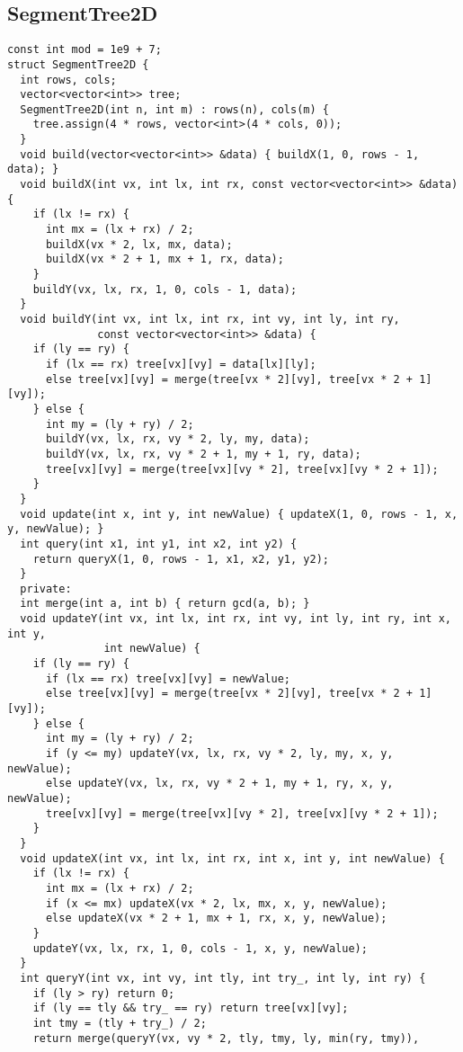 \documentclass[twoside]{article}
\begin{document}
\begin{multicols*}{2}
{\subsection*{SegmentTree2D}
}
\begin{verbatim}
const int mod = 1e9 + 7;
struct SegmentTree2D {
  int rows, cols;
  vector<vector<int>> tree;
  SegmentTree2D(int n, int m) : rows(n), cols(m) {
    tree.assign(4 * rows, vector<int>(4 * cols, 0));
  }
  void build(vector<vector<int>> &data) { buildX(1, 0, rows - 1, data); }
  void buildX(int vx, int lx, int rx, const vector<vector<int>> &data) {
    if (lx != rx) {
      int mx = (lx + rx) / 2;
      buildX(vx * 2, lx, mx, data);
      buildX(vx * 2 + 1, mx + 1, rx, data);
    }
    buildY(vx, lx, rx, 1, 0, cols - 1, data);
  }
  void buildY(int vx, int lx, int rx, int vy, int ly, int ry,
              const vector<vector<int>> &data) {
    if (ly == ry) {
      if (lx == rx) tree[vx][vy] = data[lx][ly];
      else tree[vx][vy] = merge(tree[vx * 2][vy], tree[vx * 2 + 1][vy]);
    } else {
      int my = (ly + ry) / 2;
      buildY(vx, lx, rx, vy * 2, ly, my, data);
      buildY(vx, lx, rx, vy * 2 + 1, my + 1, ry, data);
      tree[vx][vy] = merge(tree[vx][vy * 2], tree[vx][vy * 2 + 1]);
    }
  }
  void update(int x, int y, int newValue) { updateX(1, 0, rows - 1, x, y, newValue); }
  int query(int x1, int y1, int x2, int y2) {
    return queryX(1, 0, rows - 1, x1, x2, y1, y2);
  }
  private:
  int merge(int a, int b) { return gcd(a, b); }
  void updateY(int vx, int lx, int rx, int vy, int ly, int ry, int x, int y,
               int newValue) {
    if (ly == ry) {
      if (lx == rx) tree[vx][vy] = newValue;
      else tree[vx][vy] = merge(tree[vx * 2][vy], tree[vx * 2 + 1][vy]);
    } else {
      int my = (ly + ry) / 2;
      if (y <= my) updateY(vx, lx, rx, vy * 2, ly, my, x, y, newValue);
      else updateY(vx, lx, rx, vy * 2 + 1, my + 1, ry, x, y, newValue);
      tree[vx][vy] = merge(tree[vx][vy * 2], tree[vx][vy * 2 + 1]);
    }
  }
  void updateX(int vx, int lx, int rx, int x, int y, int newValue) {
    if (lx != rx) {
      int mx = (lx + rx) / 2;
      if (x <= mx) updateX(vx * 2, lx, mx, x, y, newValue);
      else updateX(vx * 2 + 1, mx + 1, rx, x, y, newValue);
    }
    updateY(vx, lx, rx, 1, 0, cols - 1, x, y, newValue);
  }
  int queryY(int vx, int vy, int tly, int try_, int ly, int ry) {
    if (ly > ry) return 0;
    if (ly == tly && try_ == ry) return tree[vx][vy];
    int tmy = (tly + try_) / 2;
    return merge(queryY(vx, vy * 2, tly, tmy, ly, min(ry, tmy)),

\end{verbatim}
\end{multicols*}
\end{document}
